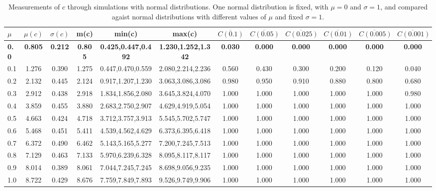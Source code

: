 \begin{table*}[h!]
\begin{center}
\begin{tabular}{| l | c | c | c | c | c | c | c | c | c | c | c |}\hline
$\mu$ & $\mu(c)$ & $\sigma(c)$ & m(c) & min(c) & max(c) & $\overline{C(0.1)}$ & $\overline{C(0.05)}$ & $\overline{C(0.025)}$ & $\overline{C(0.01)}$ & $\overline{C(0.005)}$ & $\overline{C(0.001)}$ \\\hline\hline
{\bf 0.0} & {\bf 0.805} & {\bf 0.212} & {\bf 0.805} & {\bf 0.425,0.447,0.492} & {\bf 1.230,1.252,1.342} & {\bf 0.030} & {\bf 0.000} & {\bf 0.000} & {\bf 0.000} & {\bf 0.000} & {\bf 0.000} \\\hline
0.1 & 1.276 & 0.390 & 1.275 & 0.447,0.470,0.559 & 2.080,2.214,2.236  & 0.560  & 0.430  & 0.300  & 0.200  & 0.120  & 0.040 \\\hline
0.2 & 2.132 & 0.445 & 2.124 & 0.917,1.207,1.230 & 3.063,3.086,3.086  & 0.980  & 0.950  & 0.910  & 0.880  & 0.800  & 0.680 \\\hline
0.3 & 2.912 & 0.438 & 2.918 & 1.834,1.856,2.080 & 3.645,3.824,4.070  & 1.000  & 1.000  & 1.000  & 1.000  & 1.000  & 0.980 \\\hline
0.4 & 3.859 & 0.455 & 3.880 & 2.683,2.750,2.907 & 4.629,4.919,5.054  & 1.000  & 1.000  & 1.000  & 1.000  & 1.000  & 1.000 \\\hline
0.5 & 4.663 & 0.424 & 4.718 & 3.712,3.757,3.913 & 5.545,5.702,5.747  & 1.000  & 1.000  & 1.000  & 1.000  & 1.000  & 1.000 \\\hline
0.6 & 5.468 & 0.451 & 5.411 & 4.539,4.562,4.629 & 6.373,6.395,6.418  & 1.000  & 1.000  & 1.000  & 1.000  & 1.000  & 1.000 \\\hline
0.7 & 6.372 & 0.490 & 6.462 & 5.143,5.165,5.277 & 7.200,7.245,7.513  & 1.000  & 1.000  & 1.000  & 1.000  & 1.000  & 1.000 \\\hline
0.8 & 7.129 & 0.463 & 7.133 & 5.970,6.239,6.328 & 8.095,8.117,8.117  & 1.000  & 1.000  & 1.000  & 1.000  & 1.000  & 1.000 \\\hline
0.9 & 8.014 & 0.389 & 8.061 & 7.044,7.245,7.245 & 8.698,9.056,9.235  & 1.000  & 1.000  & 1.000  & 1.000  & 1.000  & 1.000 \\\hline
1.0 & 8.722 & 0.429 & 8.676 & 7.759,7.849,7.893 & 9.526,9.749,9.906  & 1.000  & 1.000  & 1.000  & 1.000  & 1.000  & 1.000 \\\hline
\end{tabular}
\caption{Measurements of $c$ through simulations
        with normal distributions.
        One normal distribution is fixed, with $\mu=0$ and $\sigma=1$,
        and compared agaist normal distributions with different values of $\mu$ and fixed $\sigma=1$.}
\end{center}
\end{table*}